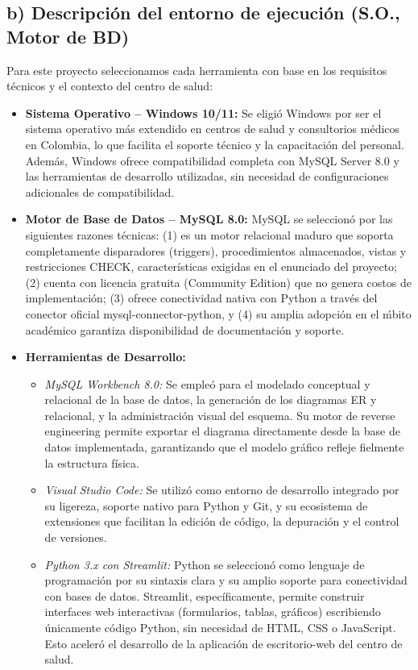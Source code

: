\documentclass[12pt,a4paper]{article}
\begin{document}
\newpage

\subsection{b) Descripci\'on del entorno de ejecuci\'on (S.O., Motor de BD)}

Para este proyecto seleccionamos cada herramienta con base en los requisitos t\'ecnicos y el contexto del centro de salud:

\begin{itemize}
    \item \textbf{Sistema Operativo -- Windows 10/11:} Se eligi\'o Windows por ser el sistema operativo m\'as extendido en centros de salud y consultorios m\'edicos en Colombia, lo que facilita el soporte t\'ecnico y la capacitaci\'on del personal. Adem\'as, Windows ofrece compatibilidad completa con MySQL Server 8.0 y las herramientas de desarrollo utilizadas, sin necesidad de configuraciones adicionales de compatibilidad.

    \item \textbf{Motor de Base de Datos -- MySQL 8.0:} MySQL se seleccion\'o por las siguientes razones t\'ecnicas: (1) es un motor relacional maduro que soporta completamente disparadores (triggers), procedimientos almacenados, vistas y restricciones CHECK, caracter\'isticas exigidas en el enunciado del proyecto; (2) cuenta con licencia gratuita (Community Edition) que no genera costos de implementaci\'on; (3) ofrece conectividad nativa con Python a trav\'es del conector oficial mysql-connector-python, y (4) su amplia adopci\'on en el \'mbito acad\'emico garantiza disponibilidad de documentaci\'on y soporte.

    \item \textbf{Herramientas de Desarrollo:}
    \begin{itemize}
        \item \textit{MySQL Workbench 8.0:} Se emple\'o para el modelado conceptual y relacional de la base de datos, la generaci\'on de los diagramas ER y relacional, y la administraci\'on visual del esquema. Su motor de reverse engineering permite exportar el diagrama directamente desde la base de datos implementada, garantizando que el modelo gr\'afico refleje fielmente la estructura f\'isica.

        \item \textit{Visual Studio Code:} Se utiliz\'o como entorno de desarrollo integrado por su ligereza, soporte nativo para Python y Git, y su ecosistema de extensiones que facilitan la edici\'on de c\'odigo, la depuraci\'on y el control de versiones.

        \item \textit{Python 3.x con Streamlit:} Python se seleccion\'o como lenguaje de programaci\'on por su sintaxis clara y su amplio soporte para conectividad con bases de datos. Streamlit, espec\'ificamente, permite construir interfaces web interactivas (formularios, tablas, gr\'aficos) escribiendo \'unicamente c\'odigo Python, sin necesidad de HTML, CSS o JavaScript. Esto aceler\'o el desarrollo de la aplicaci\'on de escritorio-web del centro de salud.
    \end{itemize}
\end{itemize}
\end{document}
